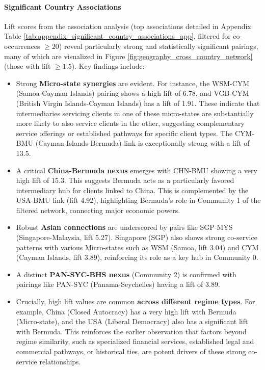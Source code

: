 \paragraph{Significant Country Associations}
Lift scores from the association analysis (top associations detailed in Appendix Table \ref{tab:appendix_significant_country_associations_app}, filtered for co-occurrences $\ge 20$) reveal particularly strong and statistically significant pairings, many of which are visualized in Figure \ref{fig:geography_cross_country_network} (those with lift $\ge 1.5$).
Key findings include:
\begin{itemize}
    \item Strong \textbf{Micro-state synergies} are evident. For instance, the WSM-CYM (Samoa-Cayman Islands) pairing shows a high lift of 6.78, and VGB-CYM (British Virgin Islands-Cayman Islands) has a lift of 1.91. These indicate that intermediaries servicing clients in one of these micro-states are substantially more likely to also service clients in the other, suggesting complementary service offerings or established pathways for specific client types. The CYM-BMU (Cayman Islands-Bermuda) link is exceptionally strong with a lift of 13.5.
    \item A critical \textbf{China-Bermuda nexus} emerges with CHN-BMU showing a very high lift of 15.3. This suggests Bermuda acts as a particularly favored intermediary hub for clients linked to China. This is complemented by the USA-BMU link (lift 4.92), highlighting Bermuda's role in Community 1 of the filtered network, connecting major economic powers.
    \item Robust \textbf{Asian connections} are underscored by pairs like SGP-MYS (Singapore-Malaysia, lift 5.27). Singapore (SGP) also shows strong co-service patterns with various Micro-states such as WSM (Samoa, lift 3.04) and CYM (Cayman Islands, lift 3.89), reinforcing its role as a key hub in Community 0.
    \item A distinct \textbf{PAN-SYC-BHS nexus} (Community 2) is confirmed with pairings like PAN-SYC (Panama-Seychelles) having a lift of 3.89.
    \item Crucially, high lift values are common \textbf{across different regime types}. For example, China (Closed Autocracy) has a very high lift with Bermuda (Micro-state), and the USA (Liberal Democracy) also has a significant lift with Bermuda. This reinforces the earlier observation that factors beyond regime similarity, such as specialized financial services, established legal and commercial pathways, or historical ties, are potent drivers of these strong co-service relationships.
\end{itemize}

